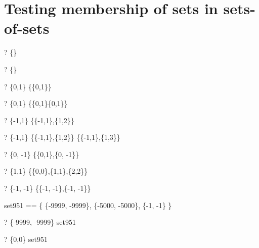 \documentclass{article}
\newcommand{\negate}{-}
\begin{document}
\section{Testing membership of sets in sets-of-sets}
\begin{zed} \vdash?  \emptyset[\nat] \in \{\emptyset\} \end{zed}
\begin{zed} \vdash?  \emptyset \in \{\emptyset \cap \emptyset[\nat]\} \end{zed}
\begin{zed} \vdash?  \{0,1\} \in \{\{0,1\}\} \end{zed}
\begin{zed} \vdash?  \{0,1\} \in \{\{0,1\}\cap\{0,1\}\} \end{zed}
\begin{zed} \vdash?  \{\negate 1,1\} \in \{\{\negate 1,1\},\{1,2\}\} \end{zed}
\begin{zed}
  \vdash?  \{\negate 1,1\} \in 
        \{\{\negate 1,1\},\{1,2\}\} \cap \{\{\negate 1,1\},\{1,3\}\}
\end{zed}
\begin{zed}
  \vdash?  \{0, \negate 1\} \in \{\{0,1\},\{0, \negate 1\}\}
\end{zed}
\begin{zed}
  \vdash?  \{1,1\} \in \{\{0,0\},\{1,1\},\{2,2\}\}
\end{zed}
\begin{zed}
  \vdash?  \{\negate 1, \negate 1\} 
       \in \{\{\negate 1, \negate 1\},\{\negate1, \negate 1\}\}
\end{zed}

\begin{zed}
  set951 == \{ \{\negate 9999, \negate 9999\},
               \{\negate 5000, \negate 5000\}, 
               \{\negate 1, \negate 1\} \}
\end{zed}

\begin{zed} \vdash?  \{\negate9999, \negate9999\} \in set951 \end{zed}
\begin{zed} \vdash?  \{0,0\} \notin set951 \end{zed}
\end{document}

